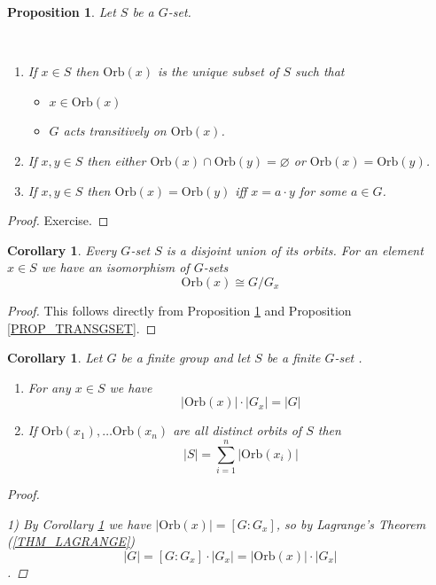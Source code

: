\documentclass[12pt, letterpaper, oneside]{article}
\theoremstyle{plain}
\newtheorem{proposition}[theorem]{Proposition}
\newtheorem{corollary}[theorem]{Corollary}
\theoremstyle{definition}
\newcommand{\Orb}{\mathrm{Orb}}
\newcommand{\benu}{\begin{enumerate}}
\newcommand{\eenu}{\end{enumerate}}
\newcommand{\bit}{\begin{itemize}}
\newcommand{\eit}{\end{itemize}}
\newcommand{\vs}{\vskip 5mm}
\newcommand{\isep}[1][0]{\setlength{\itemsep}{#1 mm}}
\begin{document}
\begin{proposition} 
\label{PROP_GSETORBITS}
Let $S$ be a $G$-set.

\vskip -13mm

\ 
\benu
\item If  $x\in S$ then $\Orb(x)$ is the unique subset of $S$ such that
\bit
\isep
\item $x\in \Orb(x)$
\item $G$ acts transitively on $\Orb(x)$.
\eit
\item If $x, y\in S$ then either $\Orb(x) \cap \Orb(y) = \varnothing$ or $\Orb(x) = \Orb(y)$. 
\item If $x, y \in S$ then $\Orb(x)=\Orb(y)$ iff $x = a\cdot y$ for some $a\in G$.
\eenu
\end{proposition}

\begin{proof}
Exercise.
\end{proof}

\vs\vs

\begin{corollary}
\label{COR_GSETDECOMPOSITION}
Every  $G$-set $S$ is a disjoint union of its orbits. For an element $x\in S$ we have 
an isomorphism of $G$-sets
$$\Orb(x)\cong G/G_{x}$$
\end{corollary}

\begin{proof}
This follows directly from Proposition \ref{PROP_GSETORBITS} and 
Proposition \ref{PROP_TRANSGSET}.
\end{proof}


\vs\vs


\begin{corollary}
\label{COR_ORBITCOUNTING}
Let $G$ be a finite group and let $S$ be a finite $G$-set . 

\benu
\isep
\item For any  $x\in S$ we have 
$$|\Orb(x)|\cdot |G_{x}| = |G|$$
\item If $\Orb(x_{1}), \dots \Orb(x_{n})$ are all distinct orbits of $S$ then 
$$|S| = \sum_{i=1}^{n} |\Orb(x_{i})|$$
\eenu 


\begin{proof}\ 

1) By Corollary \ref{COR_GSETDECOMPOSITION} we have 
$|\Orb(x)| = [G: G_{x}]$, so by Lagrange's Theorem (\ref{THM_LAGRANGE})
$$|G| = [G:G_{x}]\cdot |G_{x}| = |\Orb(x)|\cdot |G_{x}|$$. 
\end{proof}

\end{corollary}
\end{document}
